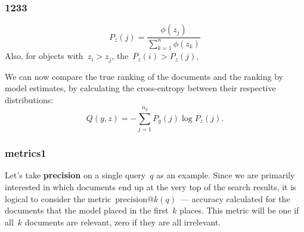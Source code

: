 \documentclass{beamer}
\begin{document}
\begin{frame}
\frametitle{1233}

\[
    P_z(j)
    =
    \frac{
        \phi(z_j)
    }{
        \sum_{k = 1}^{n}
            \phi(z_k)
    }
\]
Also, for objects with~$z_i > z_j$, the~$P_z(i) > P_z(j)$, 

We can now compare the true ranking of the documents and the ranking by model estimates,
by calculating the cross-entropy between their respective distributions:
\[
    Q(y, z)
    =
    -
    \sum_{j = 1}^{n_q}
        P_y(j)
        \log P_z(j).
\]
\end{frame}
\begin{frame}
\frametitle{metrics1}
Let's take \textbf{precision} on a single query~$q$ as an example.
Since we are primarily interested in which documents end up
at the very top of the search results, it is logical to consider the metric~\textbf{$\text{precision}@k(q)$}~---
accuracy calculated for the documents that the model placed in the first~$k$ places.
This metric will be one if all~$k$ documents are relevant,
zero if they are all irrelevant.
\end{frame}
\end{document}
